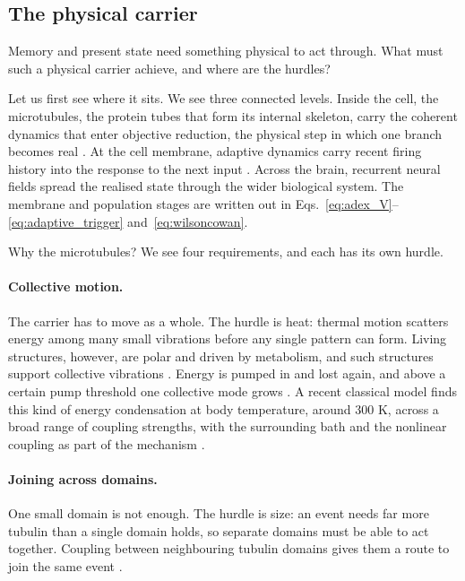 \subsection{The physical carrier}

Memory and present state need something physical to act through. What must such a
physical carrier achieve, and where are the hurdles?

Let us first see where it sits. We see three connected levels. Inside the cell,
the microtubules, the protein tubes that form its internal skeleton, carry the
coherent dynamics that enter objective reduction, the physical step in which one
branch becomes real \citep{penrose1994,penrose1996,hameroff2014}. At the cell
membrane, adaptive dynamics carry recent firing history into the response to the next
input \citep{hodgkinhuxley1952,brettegerstner2005}. Across the brain, recurrent
neural fields spread the realised state through the wider biological system. The
membrane and population stages are written out in
Eqs.~\eqref{eq:adex_V}--\eqref{eq:adaptive_trigger} and~\eqref{eq:wilsoncowan}.

Why the microtubules? We see four requirements, and each has its own hurdle.

\paragraph{Collective motion.}
The carrier has to move as a whole. The hurdle is heat: thermal motion scatters energy
among many small vibrations before any single pattern can form. Living structures,
however, are polar and driven by metabolism, and such structures support collective
vibrations \citep{frohlich1968}. Energy is pumped in and lost again, and above a
certain pump threshold one collective mode grows
\citep{zhang2019frohlich,wang2022frohlich}. A recent classical model finds this kind
of energy condensation at body temperature, around 300 K, across a broad range of
coupling strengths, with the surrounding bath and the nonlinear coupling as part of
the mechanism \citep{preto2026}.

\paragraph{Joining across domains.}
One small domain is not enough. The hurdle is size: an event needs far more tubulin
than a single domain holds, so separate domains must be able to act together.
Coupling between neighbouring tubulin domains gives them a route to join the same
event \citep{diazpalencia2025}.

